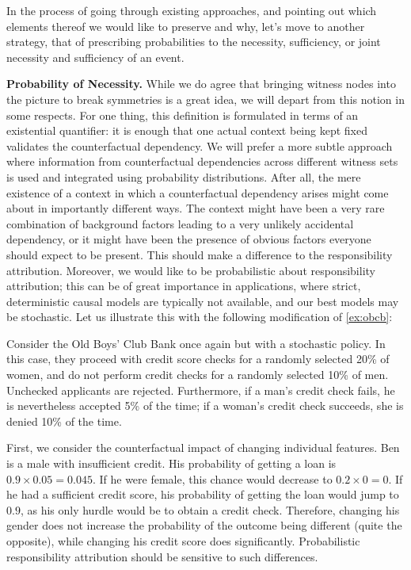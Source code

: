 \documentclass[anon,12pt]{clear2025} %
\begin{document}
\vspace{2mm}
In the process of going through existing approaches, and pointing out which elements thereof we would like to preserve and why, let's move to another strategy, that of prescribing probabilities to the necessity, sufficiency, or joint necessity and sufficiency of an event.


\vspace{2mm}
\noindent \textbf{Probability of Necessity.} While we do agree that bringing witness nodes into the picture to break symmetries is a great idea, we will depart from this notion in some respects. For one thing, this definition is formulated in terms of an existential quantifier: it is enough that one actual context being kept fixed validates the counterfactual dependency. We will prefer a more subtle approach where information from counterfactual dependencies across different witness sets is used and integrated using probability distributions. After all, the mere existence of a context in which a counterfactual dependency arises might come about in importantly different ways. The context might have been a very rare combination of background factors leading to a very unlikely accidental dependency, or it might have been the presence of obvious factors everyone should expect to be present. This should make a difference to the responsibility attribution.  Moreover, we would like to be probabilistic about responsibility attribution; this can be of great importance in applications, where strict, deterministic causal models are typically not available, and our best models may be stochastic. Let us illustrate this with the following modification of \cref{ex:obcb}: 
\begin{example}
Consider the Old Boys' Club Bank once again but with a stochastic policy. In this case, they proceed with credit score checks for a randomly selected 20\% of women, and do not perform credit checks for a randomly selected 10\% of men. Unchecked applicants are rejected. Furthermore, if a man's credit check fails, he is nevertheless accepted 5\% of the time; if a woman's credit check succeeds, she is denied 10\% of the time. \label{ex:obcb_stochastic}
\end{example} 

First, we consider the counterfactual impact of changing individual features. Ben is a male with insufficient credit. His probability of getting a loan is $0.9 \times 0.05 = 0.045$. If he were female, this chance would decrease to $0.2 \times 0=0$.
If he had a sufficient credit score, his probability of getting the loan would jump to $0.9$, as his only hurdle would be to obtain a credit check. Therefore, changing his gender does not increase the probability of the outcome being different (quite the opposite), while changing his credit score does significantly. Probabilistic responsibility attribution should be sensitive to such differences.
\end{document}
